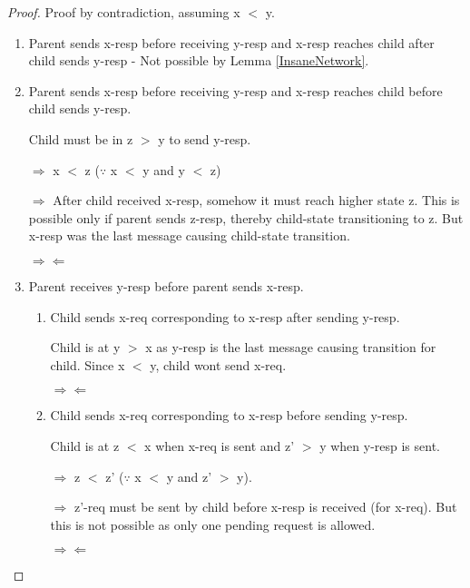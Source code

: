 \documentclass{article}
\begin{document}
\begin{proof}

Proof by contradiction, assuming x $<$ y.

\begin{enumerate}
\item Parent sends x-resp before receiving y-resp and x-resp reaches child after child sends y-resp - Not possible by Lemma \ref{InsaneNetwork}.
\item Parent sends x-resp before receiving y-resp and x-resp reaches child before child sends y-resp.

\begin{figure}
\centering
\end{figure}

Child must be in z $>$ y to send y-resp.

$\Rightarrow$ x $<$ z ($\because$ x $<$ y and y $<$ z)

$\Rightarrow$ After child received x-resp, somehow it must reach higher state z. This is possible only if parent sends z-resp, thereby child-state transitioning to z. But x-resp was the last message causing child-state transition.

$\Rightarrow \Leftarrow$

\item Parent receives y-resp before parent sends x-resp.

  \begin{enumerate}
  \item Child sends x-req corresponding to x-resp after sending y-resp.

  \begin{figure}
  \centering
  \end{figure}

  Child is at y $>$ x as y-resp is the last message causing transition for child. Since x $<$ y, child wont send x-req.

  $\Rightarrow \Leftarrow$

  \item Child sends x-req corresponding to x-resp before sending y-resp.

  \begin{figure}
  \centering
  \end{figure}

  Child is at z $<$ x when x-req is sent and z' $>$ y when y-resp is sent.

  $\Rightarrow$ z $<$ z' ($\because$ x $<$ y and z' $>$ y).

  $\Rightarrow$ z'-req must be sent by child before x-resp is received (for x-req). But this is not possible as only one pending request is allowed.

  $\Rightarrow \Leftarrow$

  \end{enumerate}

\end{enumerate}

\end{proof}
\end{document}
